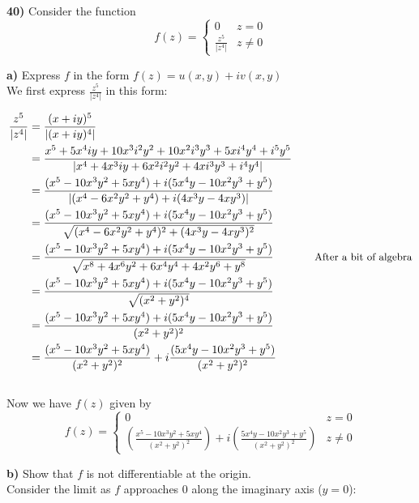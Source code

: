 \documentclass{scrartcl}
\begin{document}
\textbf{40)} Consider the function 
$$f(z) = 
\begin{cases} 
  0 & z = 0 \\
  \frac{z^5}{|z^4|} & z\ne0
\end{cases}$$

\textbf{   a)} Express $f$ in the form $f(z) = u(x,y) + iv(x,y)$\\

We first express $\frac{z^5}{|z^4|}$ in this form:

\begin{align*}
  \frac{z^5}{|z^4|} &= \frac{(x+iy)^5}{|(x+iy)^4|}\\
  &= \frac{x^5 + 5x^4iy + 10x^3i^2y^2 + 10x^2i^3y^3 + 5xi^4y^4 + i^5y^5}{|x^4 + 4x^3iy + 6x^2i^2y^2 + 4xi^3y^3 + i^4y^4|}\\
  &= \frac{(x^5 - 10x^3y^2 + 5xy^4)+i(5x^4y - 10x^2y^3 + y^5)}{|(x^4-6x^2y^2+y^4)+i(4x^3y - 4xy^3)|}\\
  &= \frac{(x^5 - 10x^3y^2 + 5xy^4)+i(5x^4y - 10x^2y^3 + y^5)}{\sqrt{(x^4-6x^2y^2+y^4)^2+(4x^3y - 4xy^3)^2}}\\
  &= \frac{(x^5 - 10x^3y^2 + 5xy^4)+i(5x^4y - 10x^2y^3 + y^5)}{\sqrt{x^8+4x^6y^2 + 6x^4y^4 + 4x^2y^6 + y^8}} \text{\hspace{0.5in}\small{After a bit of algebra}}\\
  &= \frac{(x^5 - 10x^3y^2 + 5xy^4)+i(5x^4y - 10x^2y^3 + y^5)}{\sqrt{(x^2+y^2)^4}}\\
  &= \frac{(x^5 - 10x^3y^2 + 5xy^4)+i(5x^4y - 10x^2y^3 + y^5)}{(x^2+y^2)^2}\\
  &= \frac{(x^5 - 10x^3y^2 + 5xy^4)}{(x^2+y^2)^2}+i\frac{(5x^4y - 10x^2y^3 + y^5)}{(x^2+y^2)^2}
\end{align*}\\

Now we have $f(z)$ given by
\begin{displaymath}
  f(z) = 
  \begin{cases} 
    0 & z = 0 \\
    \left(\frac{x^5 - 10x^3y^2 + 5xy^4}{{(x^2+y^2)^2}}\right) + i\left(\frac{5x^4y - 10x^2y^3 + y^5}{{(x^2+y^2)^2}}\right) & z\ne0
  \end{cases}
\end{displaymath}
\pagebreak

\textbf{   b)} Show that $f$ is not differentiable at the origin.\\

Consider the limit as $f$ approaches $0$ along the imaginary axis ($y=0$):
\end{document}
